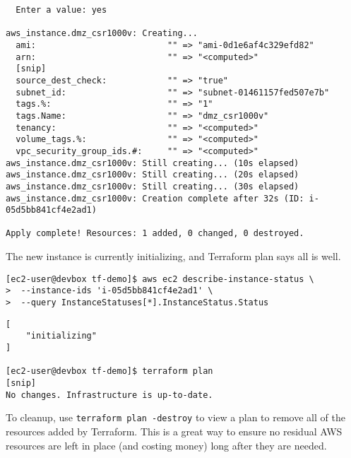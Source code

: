 \begin{verbatim}
  Enter a value: yes

aws_instance.dmz_csr1000v: Creating...
  ami:                          "" => "ami-0d1e6af4c329efd82"
  arn:                          "" => "<computed>"
  [snip]
  source_dest_check:            "" => "true"
  subnet_id:                    "" => "subnet-01461157fed507e7b"
  tags.%:                       "" => "1"
  tags.Name:                    "" => "dmz_csr1000v"
  tenancy:                      "" => "<computed>"
  volume_tags.%:                "" => "<computed>"
  vpc_security_group_ids.#:     "" => "<computed>"
aws_instance.dmz_csr1000v: Still creating... (10s elapsed)
aws_instance.dmz_csr1000v: Still creating... (20s elapsed)
aws_instance.dmz_csr1000v: Still creating... (30s elapsed)
aws_instance.dmz_csr1000v: Creation complete after 32s (ID: i-05d5bb841cf4e2ad1)

Apply complete! Resources: 1 added, 0 changed, 0 destroyed.
\end{verbatim}

The new instance is currently initializing, and Terraform plan says all is well.

\begin{verbatim}
[ec2-user@devbox tf-demo]$ aws ec2 describe-instance-status \
>  --instance-ids 'i-05d5bb841cf4e2ad1' \
>  --query InstanceStatuses[*].InstanceStatus.Status
\end{verbatim}

\begin{verbatim}
[
    "initializing"
]

[ec2-user@devbox tf-demo]$ terraform plan
[snip]
No changes. Infrastructure is up-to-date.
\end{verbatim}

To cleanup, use \verb|terraform plan -destroy| to view a plan to remove all of the
resources added by Terraform. This is a great way to ensure no residual AWS
resources are left in place (and costing money) long after they are needed.

